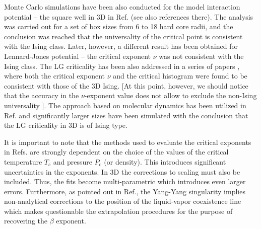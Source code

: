 \documentclass[prb,aps,twocolumn,groupedaddress,floats,showpacs,final]{revtex4}
\begin{document}
Monte Carlo simulations have been also conducted  for the model interaction potential -- the square well in 3D in Ref.\cite{SW} (see also references there).  The analysis was carried out for a set of box sizes from 6 to 18 hard core radii, and the conclusion was reached that the universality of the critical point is consistent with the Ising class. Later, however, a different result has been obtained for Lennard-Jones potential \cite{Pap} -- the critical exponent $\nu$ was not consistent with the Ising class. 
The LG criticality has been also addressed in a series of papers \cite{Fisher_2001,Fisher_2003,Fisher_2003_2}, where both the critical exponent $\nu$ and the critical histogram were found to be consistent with those of the 3D Ising. [At this point, however, we should notice that the accuracy in the $\nu$-exponent value does not allow to exclude the non-Ising universality \cite{Bondarev}]. 
The approach based on molecular dynamics has been utilized in Ref.\cite{Watanabe} and significantly larger sizes have been simulated with the conclusion that the LG criticality in 3D is of Ising type. 


It is important to note that the methods used to evaluate the critical exponents in Refs. \cite{Bruce,Wilding,SW,Pap,Watanabe} are strongly dependent on the choice of the values of the critical temperature $T_c$ and pressure $P_c$ (or density). This introduces significant uncertainties in the exponents.  In 3D the corrections to scaling must also be included. Thus, the fits become multi-parametric which introduces even larger errors. Furthermore, as pointed out in Ref.\cite{Fisher2000}, the Yang-Yang singularity
implies non-analytical corrections to the position of the  liquid-vapor  coexistence line which makes questionable the extrapolation procedures for the purpose of recovering the $\beta$ exponent.  
\end{document}
